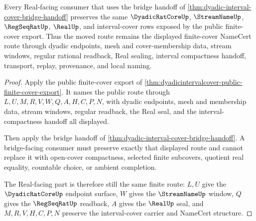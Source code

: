 \begin{theorem}
\label{thm:dyadicintervalcover-content-split-route}
Every Real-facing consumer that uses the bridge handoff of \autoref{thm:dyadic-interval-cover-bridge-handoff} preserves the same $\DyadicRatCoreUp$, $\StreamNameUp$, $\RegSeqRatUp$, $\RealUp$, and interval-cover rows exposed by the public finite-cover export. Thus the moved route remains the displayed finite-cover NameCert route through dyadic endpoints, mesh and cover-membership data, stream windows, regular rational readback, Real sealing, interval compactness handoff, transport, replay, provenance, and local naming.
\end{theorem}
\begin{proof}
Apply the public finite-cover export of \autoref{thm:dyadicintervalcover-public-finite-cover-export}. It names the public route through $L,U,M,R,V,W,Q,A,H,C,P,N$, with dyadic endpoints, mesh and membership data, stream windows, regular readback, the Real seal, and the interval-compactness handoff all displayed.

Then apply the bridge handoff of \autoref{thm:dyadic-interval-cover-bridge-handoff}. A bridge-facing consumer must preserve exactly that displayed route and cannot replace it with open-cover compactness, selected finite subcovers, quotient real equality, countable choice, or ambient completion.

The Real-facing part is therefore still the same finite route: $L,U$ give the $\DyadicRatCoreUp$ endpoint surface, $W$ gives the $\StreamNameUp$ window, $Q$ gives the $\RegSeqRatUp$ readback, $A$ gives the $\RealUp$ seal, and $M,R,V,H,C,P,N$ preserve the interval-cover carrier and NameCert structure.
\end{proof}
